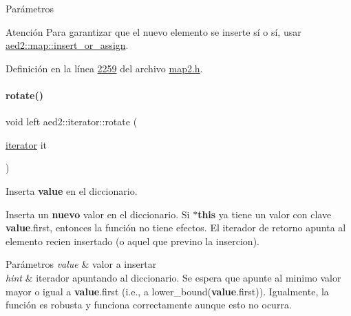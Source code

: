 \begin{DoxyParams}{\-Parámetros}
\begin{DoxyCompactItemize}
\begin{DoxyAttention}{Atención}
Para garantizar que el nuevo elemento se inserte sí o sí, usar \hyperlink{classaed2_1_1map_a2ef6723c183916276b0afc4a4c721475_a2ef6723c183916276b0afc4a4c721475}{aed2\+::map\+::insert\+\_\+or\+\_\+assign}. 
\end{DoxyAttention}


Definición en la línea \hyperlink{map2_8h_source_l02259}{2259} del archivo \hyperlink{map2_8h_source}{map2.\+h}.

\mbox{\label{classaed2_1_1iterator_af4e447a081108196ecdf39b16ecb5303_af4e447a081108196ecdf39b16ecb5303}} 
\paragraph{\texorpdfstring{rotate()}{rotate()}\hspace{0.1cm}{\footnotesize\ttfamily [1/2]}}
{\footnotesize\ttfamily void left aed2\+::iterator\+::rotate (\begin{DoxyParamCaption}\item[{\hyperlink{classaed2_1_1iterator_1_1iterator}{iterator}}]{it }\end{DoxyParamCaption})\hspace{0.3cm}{\ttfamily [inline]}}



Inserta {\bfseries value} en el diccionario. 

Inserta un {\bfseries nuevo} valor en el diccionario. Si {\bfseries $\ast$this} ya tiene un valor con clave {\bfseries value}.first, entonces la función no tiene efectos. El iterador de retorno apunta al elemento recien insertado (o aquel que previno la insercion).


\begin{DoxyParams}{Parámetros}
{\em value} & valor a insertar \\
\hline
{\em hint} & iterador apuntando al diccionario. Se espera que apunte al minimo valor mayor o igual a {\bfseries value}.first (i.\+e., a lower\+\_\+bound({\bfseries value}.first)). Igualmente, la función es robusta y funciona correctamente aunque esto no ocurra. \\
\hline
\end{DoxyParams}


\end{DoxyCompactItemize}
\end{DoxyParams}
